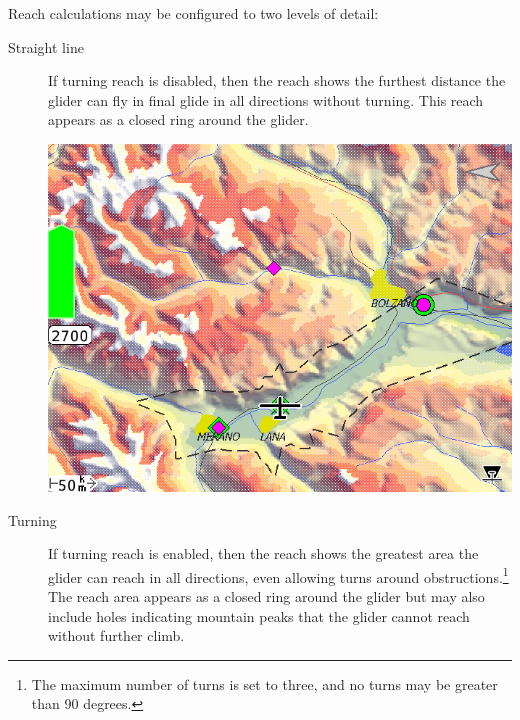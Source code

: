Reach calculations may be configured  to two levels of detail:
\begin{description}
\item[Straight line] If turning reach is disabled, then the reach shows the
 furthest distance the glider can fly in final glide in all directions without
 turning.  This reach appears as a closed ring around the glider.

\begin{center}
\includegraphics[angle=0,width=1.0\linewidth,keepaspectratio='true']{figures/reach1.png}
\end{center}

\item[Turning] If turning reach is enabled, then the reach shows the
  greatest area the glider can reach in all directions, even allowing
  turns around obstructions.\footnote{The maximum number of turns is
    set to three, and no turns may be greater than 90 degrees.}  The
  reach area appears as a closed ring around the glider but may also
  include holes indicating mountain peaks that the glider cannot reach
  without further climb.


\end{description}

